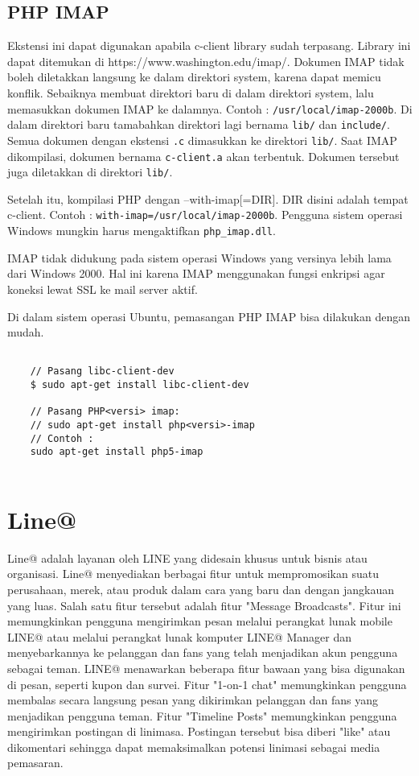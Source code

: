 \subsection{PHP IMAP ~\cite{php-imap}}
Ekstensi ini dapat digunakan apabila c-client library sudah terpasang. Library ini dapat ditemukan di https://www.washington.edu/imap/. Dokumen IMAP tidak boleh diletakkan langsung ke dalam direktori system, karena dapat memicu konflik. Sebaiknya membuat direktori baru di dalam direktori system, lalu memasukkan dokumen IMAP ke dalamnya. Contoh : \texttt{/usr/local/imap-2000b}. Di dalam direktori baru tamabahkan direktori lagi bernama \texttt{lib/} dan \texttt{include/}. Semua dokumen dengan ekstensi \texttt{.c} dimasukkan ke direktori \texttt{lib/}. Saat IMAP dikompilasi, dokumen bernama \texttt{c-client.a} akan terbentuk. Dokumen tersebut juga diletakkan di direktori \texttt{lib/}.

Setelah itu, kompilasi PHP dengan --with-imap[=DIR]. DIR disini adalah tempat c-client. Contoh : \texttt{with-imap=/usr/local/imap-2000b}. Pengguna sistem operasi Windows mungkin harus mengaktifkan \texttt{php\_imap.dll}.

IMAP tidak didukung pada sistem operasi Windows yang versinya lebih lama dari Windows 2000. Hal ini karena IMAP menggunakan fungsi enkripsi agar koneksi lewat SSL ke mail server aktif.

Di dalam sistem operasi Ubuntu, pemasangan PHP IMAP bisa dilakukan dengan mudah.
\begin{lstlisting}
	
	// Pasang libc-client-dev
	$ sudo apt-get install libc-client-dev

	// Pasang PHP<versi> imap:
	// sudo apt-get install php<versi>-imap
	// Contoh : 
	sudo apt-get install php5-imap
		
\end{lstlisting}

\section{Line@}
\label{sec:Line@}
Line@ adalah layanan oleh LINE yang didesain khusus untuk bisnis atau organisasi. Line@ menyediakan berbagai fitur untuk mempromosikan suatu perusahaan, merek, atau produk dalam cara yang baru dan dengan jangkauan yang luas. Salah satu fitur tersebut adalah fitur "Message Broadcasts". Fitur ini memungkinkan pengguna mengirimkan pesan melalui perangkat lunak mobile LINE@ atau melalui perangkat lunak komputer LINE@ Manager dan menyebarkannya ke pelanggan dan fans yang telah menjadikan akun pengguna sebagai teman. LINE@ menawarkan beberapa fitur bawaan yang bisa digunakan di pesan, seperti kupon dan survei. Fitur "1-on-1 chat" memungkinkan pengguna membalas secara langsung pesan yang dikirimkan pelanggan dan fans yang menjadikan pengguna teman. Fitur "Timeline Posts" memungkinkan pengguna mengirimkan postingan di linimasa. Postingan tersebut bisa diberi "like" atau dikomentari sehingga dapat memaksimalkan potensi linimasi sebagai media pemasaran.
